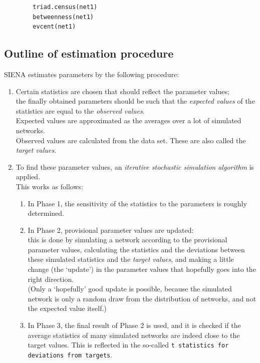 \documentclass[a4paper,fleqn]{article}
\newcommand{\+}{\, + \,}
\newcommand{\SI}{{\sf SIENA }}
\begin{document}
{\begin{verbatim}
        triad.census(net1)
        betweenness(net1)
        evcent(net1)
\end{verbatim}

\subsection{Outline of estimation procedure}
\noindent
\SI estimates parameters by the following procedure:
\begin{enumerate}
\item  Certain statistics are chosen that should reflect the parameter values;\\
  the finally obtained parameters should be such that the \emph{expected
    values}
  of the statistics are equal to the \emph{observed values}.\\
  Expected values are approximated as the averages over a lot of simulated
  networks.\\
  Observed values are calculated from the data set. These are also called the
  \emph{target values}.
\item To find these parameter values, an \emph{iterative stochastic simulation
    algorithm}
  is applied.\\
  This works as follows:
\begin{enumerate}
\item In Phase 1, the sensitivity of the statistics to the parameters is roughly
  determined.
\item In Phase 2, provisional parameter values are updated:\\
  this is done by simulating a network according to the provisional parameter
  values, calculating the statistics and the deviations between these simulated
  statistics and the \emph{target values}, and making a little change (the
  `update') in the parameter values
  that hopefully goes into the right direction.\\
  (Only a `hopefully' good update is possible, because the simulated network is
  only a random draw from the distribution of networks, and not the expected
  value itself.)
\item In Phase 3, the final result of Phase 2 is used, and it is checked if the
  average statistics of many simulated networks are indeed close to the target
  values. This is reflected in the so-called \texttt{t statistics for deviations
    from targets}.
\end{enumerate}
\end{enumerate}

}
\end{document}
